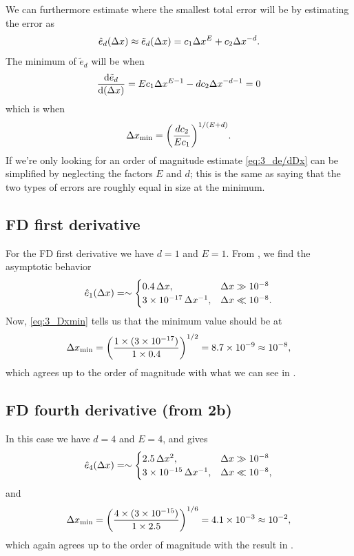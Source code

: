 \documentclass[11pt,letter, swedish, english
]{article}
\begin{document}
We can furthermore estimate where the smallest total error will be by
estimating the error as
\begin{equation}
\hat{e}_d(\Delta{x})\approx\tilde{e}_d(\Delta{x})=c_1\Delta{x}^E + c_2\Delta{x}^{-d}.
\end{equation}
The minimum of $\tilde{e}_d$ will be when
\begin{equation}\label{eq:3_de/dDx}
\dv{\tilde{e}_d}{(\ensuremath{\Delta{x}})}=Ec_1\Delta{x}^{E-1}-dc_2\Delta{x}^{-d-1}=0
\end{equation}
which is when
\begin{equation}\label{eq:3_Dxmin}
\Delta{x}_\text{min}=\qty(\frac{dc_2}{Ec_1})^{1/(E+d)}.
\end{equation}
If we're only looking for an order of magnitude estimate
\eqref{eq:3_de/dDx} can be simplified by neglecting the factors $E$
and $d$; this is the same as saying that the two types of errors are
roughly equal in size at the minimum.

\subsection{FD first derivative}
For the FD first derivative we have $d=1$ and $E=1$.
From , we find the asymptotic behavior
\begin{equation}
\hat{e}_1(\Dx)=
\sim\begin{cases}
0.4\,\Dx \qcomma& \Dx\gg 10^{-8}\\
3\times10^{-17}\,\Dx^{-1},& \Dx\ll 10^{-8}.
\end{cases}
\end{equation}
Now, \eqref{eq:3_Dxmin} tells us that the minimum value should be at 
\begin{equation}
\Delta{x}_\text{min}=\qty(\frac{1\times(3\times10^{-17})}{1\times0.4})^{1/2}
=8.7\times10^{-9}\approx 10^{-8},
\end{equation}
which agrees up to the order of magnitude with what we can see in
. 


\subsection{FD fourth derivative (from 2b)}
In this case we have $d=4$ and $E=4$, and  gives
\begin{equation}
\hat{e}_4(\Dx)=
\sim\begin{cases}
2.5\,\Dx^2 \qcomma& \Dx\gg 10^{-8}\\
3\times10^{-15}\,\Dx^{-1},& \Dx\ll 10^{-8},
\end{cases}
\end{equation}
and 
\begin{equation}
\Delta{x}_\text{min}=\qty(\frac{4\times(3\times10^{-15})}{1\times2.5})^{1/6}
=4.1\times10^{-3}\approx 10^{-2},
\end{equation}
which again agrees up to the order of magnitude with the result in
.
\end{document}
